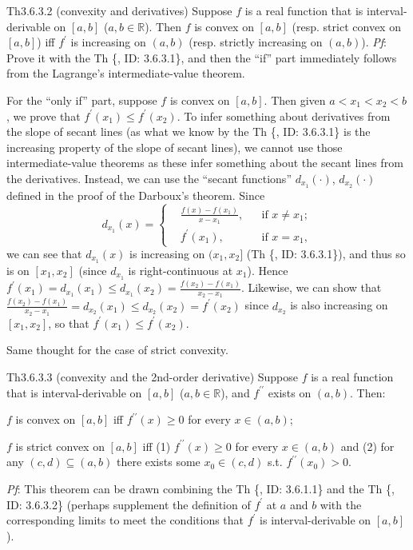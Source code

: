 \documentclass{article}
\begin{document}
\begin{Th}{Th3.6.3.2 (convexity and derivatives)}
    Suppose $f$ is a real function that is interval-derivable on $[a,b]$ ($a,b\in\mathbb{R}$). Then $f$ is convex on $[a,b]$ (resp. strict convex on $[a,b]$) iff $f^\prime$ is increasing on $(a,b)$ (resp. strictly increasing on $(a,b)$).
    \tcblower
    \textit{Pf}: Prove it with the Th \{, ID: 3.6.3.1\}, and then the ``if'' part immediately follows from the Lagrange's intermediate-value theorem. 

    For the ``only if'' part, suppose $f$ is convex on $[a,b]$. Then given $a<x_1<x_2<b$, we prove that $f^\prime(x_1)\leq f^\prime(x_2)$. To infer something about derivatives from the slope of secant lines (as what we know by the Th \{, ID: 3.6.3.1\} is the increasing property of the slope of secant lines), we cannot use those intermediate-value theorems as these infer something about the secant lines from the derivatives. Instead, we can use the ``secant functions'' $d_{x_1}(\cdot)$, $d_{x_2}(\cdot)$ defined in the proof of the Darboux's theorem. Since 
    $$ d_{x_1}(x) = \left\{
        \begin{aligned}
            &\frac{f(x)-f(x_1)}{x-x_1}, && \text{if } x\neq x_1;\\
            &f^\prime(x_1), && \text{if } x = x_1,
        \end{aligned}\right.
    $$
    we can see that $d_{x_1}(x)$ is increasing on $(x_1, x_2]$ (Th \{, ID: 3.6.3.1\}), and thus so is on $[x_1, x_2]$ (since $d_{x_1}$ is right-continuous at $x_1$). Hence $f^\prime(x_1) = d_{x_1}(x_1) \leq d_{x_1}(x_2) = \frac{f(x_2)-f(x_1)}{x_2-x_1}$. Likewise, we can show that $\frac{f(x_2)-f(x_1)}{x_2-x_1} = d_{x_2}(x_1) \leq d_{x_2}(x_2) = f^\prime(x_2)$ since $d_{x_2}$ is also increasing on $[x_1, x_2]$, so that $f^\prime(x_1)\leq f^\prime(x_2)$.
    
    Same thought for the case of strict convexity.
\end{Th}

\begin{Th}{Th3.6.3.3 (convexity and the 2nd-order derivative)}
    Suppose $f$ is a real function that is interval-derivable on $[a,b]$ ($a,b\in\mathbb{R}$), and $f^{\prime\prime}$ exists on $(a,b)$. Then:
    \begin{compactenum}
        \item $f$ is convex on $[a,b]$ iff $f^{\prime\prime}(x)\geq 0$ for every $x\in (a,b)$;
        \item $f$ is strict convex on $[a,b]$ iff (1) $f^{\prime\prime}(x)\geq 0$ for every $x\in (a,b)$ and (2) for any $(c,d)\subseteq (a,b)$ there exists some $x_0\in (c,d)$ s.t. $f^{\prime\prime}(x_0) > 0$.
    \end{compactenum}
    \tcblower
    \textit{Pf}: This theorem can be drawn combining the Th \{, ID: 3.6.1.1\} and the Th \{, ID: 3.6.3.2\} (perhaps supplement the definition of $f^\prime$ at $a$ and $b$ with the corresponding limits to meet the conditions that $f^\prime$ is interval-derivable on $[a,b]$).
\end{Th}
\end{document}
